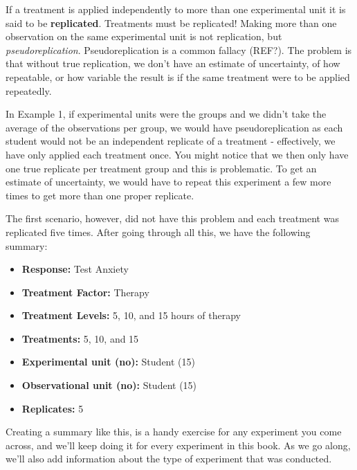\documentclass[
  letterpaper,
  DIV=11,
  numbers=noendperiod,
  oneside]{scrreprt}
\providecommand{\tightlist}{%
  \setlength{\itemsep}{0pt}\setlength{\parskip}{0pt}}\usepackage{longtable,booktabs,array}
\begin{document}

If a treatment is applied independently to more than one experimental
unit it is said to be \textbf{replicated}. Treatments must be
replicated! Making more than one observation on the same experimental
unit is not replication, but \emph{pseudoreplication}. Pseudoreplication
is a common fallacy (REF?). The problem is that without true
replication, we don't have an estimate of uncertainty, of how
repeatable, or how variable the result is if the same treatment were to
be applied repeatedly.

In Example 1, if experimental units were the groups and we didn't take
the average of the observations per group, we would have
pseudoreplication as each student would not be an independent replicate
of a treatment - effectively, we have only applied each treatment once.
You might notice that we then only have one true replicate per treatment
group and this is problematic. To get an estimate of uncertainty, we
would have to repeat this experiment a few more times to get more than
one proper replicate.

The first scenario, however, did not have this problem and each
treatment was replicated five times. After going through all this, we
have the following summary:

\begin{itemize}
\tightlist
\item
  \textbf{Response:} Test Anxiety\\
\item
  \textbf{Treatment Factor:} Therapy\\
\item
  \textbf{Treatment Levels:} 5, 10, and 15 hours of therapy\\
\item
  \textbf{Treatments:} 5, 10, and 15\\
\item
  \textbf{Experimental unit (no):} Student (15)\\
\item
  \textbf{Observational unit (no):} Student (15)\\
\item
  \textbf{Replicates:} 5
\end{itemize}

\begin{tcolorbox}[enhanced jigsaw, colframe=quarto-callout-tip-color-frame, breakable, arc=.35mm, toptitle=1mm, colback=white, title=\textcolor{quarto-callout-tip-color}{\faLightbulb}\hspace{0.5em}{Tip}, opacityback=0, bottomrule=.15mm, opacitybacktitle=0.6, colbacktitle=quarto-callout-tip-color!10!white, toprule=.15mm, rightrule=.15mm, bottomtitle=1mm, leftrule=.75mm, titlerule=0mm, coltitle=black, left=2mm]

Creating a summary like this, is a handy exercise for any experiment you
come across, and we'll keep doing it for every experiment in this book.
As we go along, we'll also add information about the type of experiment
that was conducted.

\end{tcolorbox}
\end{document}
